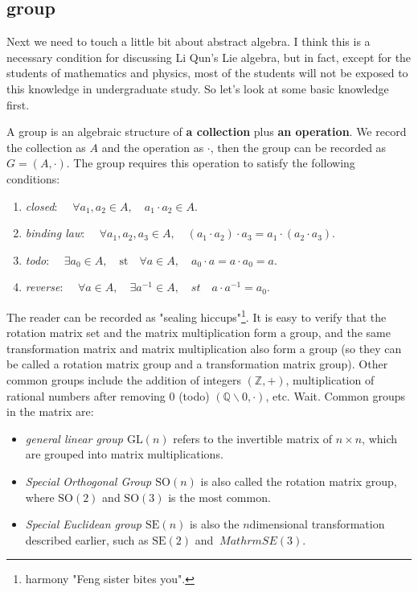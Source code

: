 \subsection{group}

Next we need to touch a little bit about abstract algebra. I think this is a necessary condition for discussing Li Qun's Lie algebra, but in fact, except for the students of mathematics and physics, most of the students will not be exposed to this knowledge in undergraduate study. So let's look at some basic knowledge first.

A group is an algebraic structure of \textbf{a collection} plus \textbf{an operation}. We record the collection as $A$ and the operation as $\cdot$, then the group can be recorded as $G=(A,\cdot)$. The group requires this operation to satisfy the following conditions:

\begin{enumerate}
\item { \emph{closed}}: $ \quad \forall a_1, a_2 \in A, \quad a_1 \cdot a_2 \in A$.
\item { \emph{binding law}}: $ \quad \forall a_1, a_2, a_3 \in A, \quad (a_1 \cdot a_2) \cdot a_3 = a_1 \cdot ( a_2 \cdot a_3) $.
\item { \emph{todo}}: $ \quad \exists a_0 \in A, \quad \mathrm{st} \quad \forall a \in A, \quad a_0 \cdot a = a \cdot a_0 = a $.
\item { \emph{reverse}}: $ \quad \forall a \in A, \quad \exists a^{-1} \in A, \quad st \quad a \cdot a^{-1} = a_0 $.
\end{enumerate}

The reader can be recorded as "sealing hiccups"\footnote{harmony "Feng sister bites you". }. It is easy to verify that the rotation matrix set and the matrix multiplication form a group, and the same transformation matrix and matrix multiplication also form a group (so they can be called a rotation matrix group and a transformation matrix group). Other common groups include the addition of integers $(\mathbb{Z}, +)$, multiplication of rational numbers after removing 0 (todo) $(\mathbb{Q}\backslash 0, \cdot )$, etc. Wait. Common groups in the matrix are:

\begin{itemize}
\item \emph{general linear group $\mathrm{GL}(n)$} \quad refers to the invertible matrix of $n \times n$, which are grouped into matrix multiplications.

\item \emph{Special Orthogonal Group $\mathrm{SO}(n)$} \quad is also called the rotation matrix group, where $\mathrm{SO}(2)$ and $\mathrm{SO}(3 ) $ is the most common.

\item \emph{Special Euclidean group $\mathrm{SE}(n)$} \quad is also the $n$dimensional transformation described earlier, such as $\mathrm{SE}(2)$ and $\ Mathrm{SE}(3)$.
\end{itemize}

